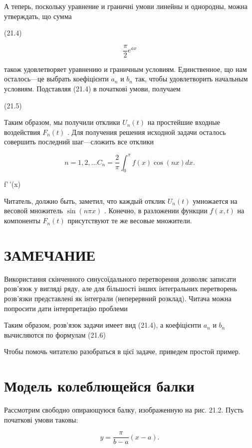 \documentclass[
  ukrainian,
]{article}
\begin{document}
А теперь, поскольку уравнение и граничні умови линейны и однородны,
можна утверждать, що сумма

(21.4)

\[
\frac{\pi}{2} e^{ax}
\]

також удовлетворяет уравнению и граничным условиям. Единственное, що нам
осталось---це выбрать коефіцієнти \(a_n\) и \(b_n\) так, чтобы
удовлетворить начальным условиям. Подставляя (21.4) в початкові умови,
получаем

(21.5)

Таким образом, мы получили отклики \(U_n(t)\) на простейшие входные
воздействия \(F_n(t)\) . Для получения решения исходной задачи осталось
совершить последний шаг---сложить все отклики

\[
n = 1, 2, ...
C_n = \frac{2}{\pi} \int_0^{\pi} f(x) \cos(nx) dx.
\]

f'\,'(x)

Читатель, должно быть, заметил, что каждый отклик \(U_n(t)\) умножается
на весовой множитель \(\sin(n\pi x)\) . Конечно, в разложении функции
\(f(x, t)\) на компоненты \(F_n(t)\) присутствуют те же весовые
множители.

\section{ЗАМЕЧАНИЕ}\label{ux437ux430ux43cux435ux447ux430ux43dux438ux435}

Використання скінченного синусоїдального перетворення дозволяє записати
розв'язок у вигляді ряду, але для більшості інших інтегральних
перетворень розв'язки представлені як інтеграли (неперервний розклад).
Читача можна попросити дати інтерпретацію проблеми

Таким образом, розв'язок задачи имеет вид (21.4), а коефіцієнти \(a_n\)
и \(b_n\) вычисляются по формулам (21.6)

Чтобы помочь читателю разобраться в цієї задаче, приведем простой
пример.

\section{Модель колеблющейся
балки}\label{ux43cux43eux434ux435ux43bux44c-ux43aux43eux43bux435ux431ux43bux44eux449ux435ux439ux441ux44f-ux431ux430ux43bux43aux438}

Рассмотрим свободно опирающуюся балку, изображенную на рис. 21.2. Пусть
початкові умови таковы:

\[
y = \frac{\pi}{b-a}(x-a).
\]
\end{document}
